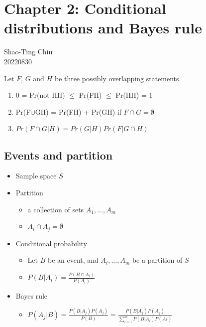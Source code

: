 \documentclass[
  letterpaper,
  DIV=11,
  numbers=noendperiod]{scrreprt}
\providecommand{\tightlist}{%
  \setlength{\itemsep}{0pt}\setlength{\parskip}{0pt}}\usepackage{longtable,booktabs,array}
\begin{document}

\hypertarget{chapter-2-conditional-distributions-and-bayes-rule}{%
\chapter{Chapter 2: Conditional distributions and Bayes
rule}\label{chapter-2-conditional-distributions-and-bayes-rule}}

Shao-Ting Chiu\\
20220830

\hfill\break

Let \(F\), \(G\) and \(H\) be three possibly overlapping statements.

\begin{enumerate}
\def\labelenumi{\arabic{enumi}.}
\tightlist
\item
  0 = Pr(not H\textbar H) \(\leq\) Pr(F\textbar H) \(\leq\)
  Pr(H\textbar H) = 1
\item
  Pr(F\(\cup\)G\textbar H) = Pr(F\textbar H) + Pr(G\textbar H) if
  \(F\cap G=\emptyset\)
\item
  \(Pr(F\cap G|H)=Pr(G|H)Pr(F|G\cap H)\)
\end{enumerate}

\hypertarget{events-and-partition}{%
\section{Events and partition}\label{events-and-partition}}

\begin{itemize}
\tightlist
\item
  Sample space \(S\)
\item
  Partition

  \begin{itemize}
  \tightlist
  \item
    a collection of sets \(A_1,\dots, A_m\)
  \item
    \(A_{i} \cap A_j = \emptyset\)
  \end{itemize}
\item
  Conditional probability

  \begin{itemize}
  \tightlist
  \item
    Let \(B\) be an event, and \(A_i,\dots,A_m\) be a partition of \(S\)
  \item
    \(P(B|A_i) = \frac{P(B\cap A_i)}{P(A_i)}\)
  \end{itemize}
\item
  Bayes rule

  \begin{itemize}
  \tightlist
  \item
    \(P(A_j |B) = \frac{P(B|A_j)P(A_j)}{P(B)} = \frac{P(B|A_j)P(A_j)}{\sum^{m}_{i=1}P(B|A_i)P(Ai)}\)
  \end{itemize}
\end{itemize}
\end{document}
